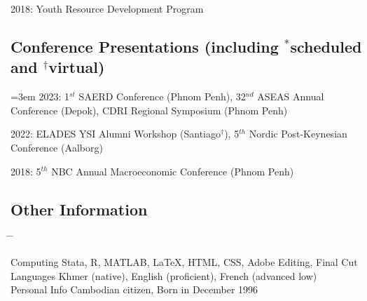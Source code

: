 \documentclass[10pt,a4paper]{article}
\newcommand{\tabbedblock}[1]{

	\begin{tabbing}
		\hspace{3cm} \= \hspace{4cm} \= \kill
		#1
	\end{tabbing}
}
\begin{document}
	2018: Youth Resource Development Program
	
\subsection*{Conference Presentations (including $^\ast$scheduled and $^\dag$virtual)}

\hangindent=3em
	2023:  1$^{st}$ SAERD Conference (Phnom Penh), 32$^{nd}$ ASEAS Annual Conference (Depok), CDRI Regional Symposium (Phnom Penh)
	
	
	2022:  ELADES YSI Alumni Workshop (Santiago$^\dag$), 5$^{th}$ Nordic Post-Keynesian Conference (Aalborg)

	2018: 5$^{th}$ NBC Annual Macroeconomic Conference (Phnom Penh)


\subsection*{Other Information}

\tabbedblock{
	Computing \> Stata, R, MATLAB, \LaTeX, HTML, CSS,  Adobe Editing, Final Cut\\

	Languages \> Khmer (native), English (proficient), French (advanced low)\\
	
	Personal Info \> Cambodian citizen, Born in December 1996
}

\end{document}
